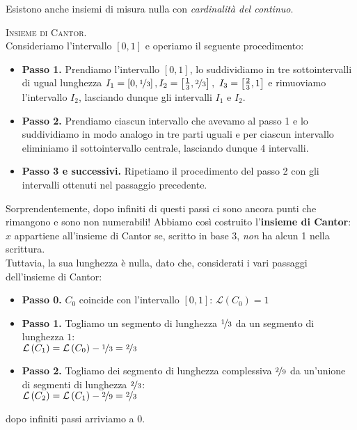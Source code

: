 Esistono anche insiemi di misura nulla con \textit{cardinalità del continuo}.
\begin{example}\textsc{Insieme di Cantor.}~{}\\
Consideriamo l'intervallo $\left[0,1\right]$ e operiamo il seguente procedimento:
\begin{itemize}
	\item \textbf{Passo 1.} Prendiamo l'intervallo $\left[0,1\right]$, lo suddividiamo in tre sottointervalli di ugual lunghezza $I_1=\left[0,\nicefrac{1}{3}\right], I_2=\left[\frac{1}{3},\nicefrac{2}{3}\right],\ I_3=\left[\frac{2}{3},1\right]$ e rimuoviamo l'intervallo $I_2$, lasciando dunque gli intervalli $I_1$ e $I_2$.
	\item \textbf{Passo 2.} Prendiamo ciascun intervallo che avevamo al passo 1 e lo suddividiamo in modo analogo in tre parti uguali e per ciascun intervallo eliminiamo il sottointervallo centrale, lasciando dunque 4 intervalli.
	\item \textbf{Passo 3 e successivi.} Ripetiamo il procedimento del passo 2 con gli intervalli ottenuti nel passaggio precedente.
\end{itemize}
Sorprendentemente, dopo infiniti di questi passi ci sono ancora punti che rimangono e sono non numerabili! Abbiamo così costruito l'\textbf{insieme di Cantor}: $x$ appartiene all'insieme di Cantor se, scritto in base 3, \textit{non} ha alcun 1 nella scrittura.\\
Tuttavia, la sua lunghezza è nulla, dato che, considerati i vari passaggi dell'insieme di Cantor:
\begin{itemize}
	\item \textbf{Passo 0.} $C_0$ coincide con l'intervallo $\left[0,1\right]$: $\mathcal{L}\left(C_0\right)=1$
	\item \textbf{Passo 1.} Togliamo un segmento di lunghezza $\nicefrac{1}{3}$ da un segmento di lunghezza $1$:\\ $\mathcal{L}\left(C_1\right)=\mathcal{L}\left(C_0\right)-\nicefrac{1}{3}=\nicefrac{2}{3}$
	\item \textbf{Passo 2.} Togliamo dei segmento di lunghezza complessiva $\nicefrac{2}{9}$ da un'unione di segmenti di lunghezza $\nicefrac{2}{3}$:\\ $\mathcal{L}\left(C_2\right)=\mathcal{L}\left(C_1\right)-\nicefrac{2}{9}=\nicefrac{2}{3}$
\end{itemize}
dopo infiniti passi arriviamo a $0$.
\end{example}
